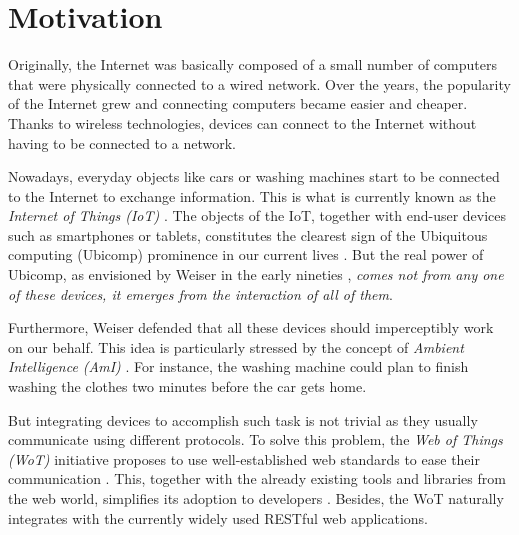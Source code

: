 \section{Motivation}
\label{sec:Motivation}


Originally, the Internet was basically composed of a small number of computers that were physically connected to a wired network.
Over the years, the popularity of the Internet grew and connecting computers became easier and cheaper.
Thanks to wireless technologies, devices can connect to the Internet without having to be connected to a network.

Nowadays, everyday objects like cars or washing machines start to be connected to the Internet to exchange information.
This is what is currently known as the \emph{Internet of Things (IoT)} \cite{atzori_internet_2010}.
The objects of the IoT, together with end-user devices such as smartphones or tablets, constitutes the clearest sign of the Ubiquitous computing (Ubicomp) prominence in our current lives \cite{caceres_ubicomp_2012}.
But the real power of Ubicomp, as envisioned by Weiser in the early nineties \cite{weiser1991computer}, \emph{comes not from any one of these devices, it emerges from the interaction of all of them}.

Furthermore, Weiser defended that all these devices should imperceptibly work on our behalf.
This idea is particularly stressed by the concept of \emph{Ambient Intelligence (AmI)} \cite{ramos_ambient_2008}.
For instance, the washing machine could plan to finish washing the clothes two minutes before the car gets home.

\medskip

But integrating devices to accomplish such task is not trivial as they usually communicate using different protocols.
To solve this problem, the \emph{Web of Things (WoT)} initiative proposes to use well-established web standards to ease their communication \cite{guinard_thesis_2011}.
This, together with the already existing tools and libraries from the web world, simplifies its adoption to developers \cite{guinard_search_2011}.
Besides, the WoT naturally integrates with the currently widely used RESTful web applications.

